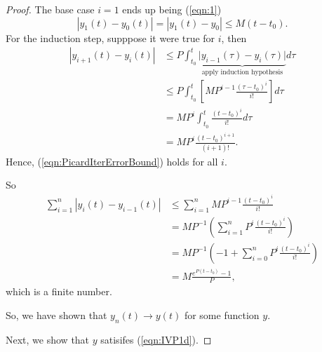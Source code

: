\documentclass{article}
\begin{document}
\begin{proof}
The base case $i=1$ ends up being (\ref{eqn:1}) 
\[
    |y_1(t) - y_0(t)|
    =
    |y_1(t) - y_0| 
    \leq
    M(t-t_0).
\]
For the induction step, supppose it were true for $i$, then
\begin{align*}
    |y_{i+1}(t)-y_i(t)|
    &\leq
    P
    \int_{t_0}^t
    \underbrace{
        \big\lvert
            y_{i-1}(\tau) - y_i(\tau)
        \big\rvert
    }_{\text{apply induction hypothesis}}
    d\tau \\
    &\leq
    P
    \int_{t_0}^t
    \left[
        MP^{i-1}\frac{(\tau-t_0)^i}{i!}
    \right]
    d\tau
    \\
    &=
    MP^i
    \int_{t_0}^t
    \frac{(t-t_0)^i}{i!}
    d\tau \\
    &=
    MP^i\frac{(t-t_0)^{i+1}}{(i+1)!}.
\end{align*}
Hence, (\ref{eqn:PicardIterErrorBound}) holds for all $i$.

So
\begin{align*}
    \sum_{i=1}^n 
    |y_i(t) - y_{i-1}(t)|
    &\leq
    \sum_{i=1}^n
    MP^{i-1}\frac{(t-t_0)^i}{i!} \\
    &=
    MP^{-1}\left(
        \sum_{i=1}^n
        P^i\frac{(t-t_0)^i}{i!} 
    \right) \\
    &=
    MP^{-1}\left(
        -1 + \sum_{i=0}^n
        P^i\frac{(t-t_0)^i}{i!} 
    \right) \\
    &=
    M\frac{e^{P(t-t_0)}-1}{P},
\end{align*}
which is a finite number.

So, we have shown that $y_n(t) \to y(t)$ for some function $y$.

Next, we show that $y$ satisifes (\ref{eqn:IVP1d}).


\end{proof}
\end{document}
